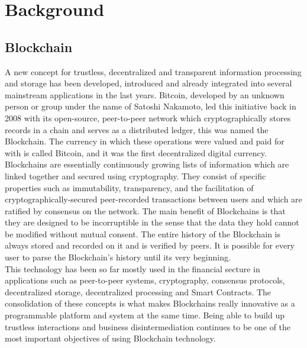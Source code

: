\section{Background}

\subsection{Blockchain}

A new concept for trustless, decentralized and transparent information processing and storage has been developed, introduced and already integrated into several mainstream applications in the last years. Bitcoin, developed by an unknown person or group under the name of Satoshi Nakamoto\cite{nakamoto2008bitcoin}, led this initiative back in 2008 with its open-source, peer-to-peer network which cryptographically stores records in a chain and serves as a distributed ledger, this was named the Blockchain. The currency in which these operations were valued and paid for with is called Bitcoin, and it was the first decentralized digital currency.\\
Blockchains are essentially continuously growing lists of information which are linked together and secured using cryptography. They consist of specific properties such as immutability, transparency, and the facilitation of cryptographically-secured peer-recorded transactions between users and  which are ratified by consensus on the network.
The main benefit of Blockchains is that they are designed to be incorruptible in the sense that the data they hold cannot be modified without mutual consent. The entire history of the Blockchain is always stored and recorded on it and is verified by peers. It is possible for every user to parse the Blockchain's history until its very beginning.\\
This technology has been so far mostly used in the financial secture in applications such as peer-to-peer systems, cryptography, consensus protocols, decentralized storage, decentralized processing and Smart Contracts. The consolidation of these concepts is what makes Blockchains really innovative as a programmable platform and system at the same time.
Being able to build up trustless interactions and business disintermediation continues to be one of the most important objectives of using Blockchain technology.

